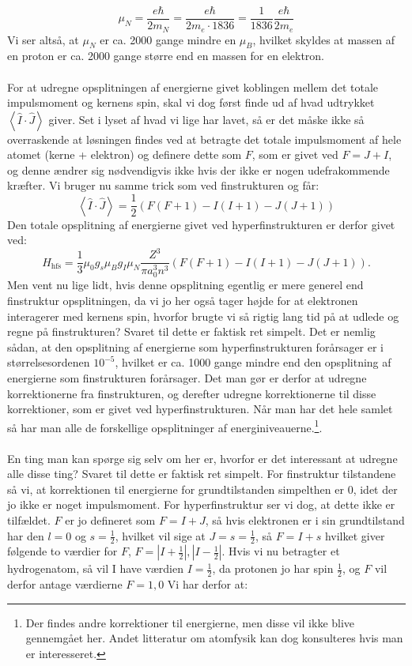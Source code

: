 \documentclass[../../Atom-ogMolekylefysik.tex]{subfiles}
\begin{document}
\begin{equation}
    \mu_N=\frac{e\hbar}{2m_N}=\frac{e\hbar}{2m_e\cdot1836}=\frac{1}{1836}\frac{e\hbar}{2m_e}
\end{equation}
Vi ser altså, at $\mu_N$ er ca. 2000 gange mindre en $\mu_B$, hvilket skyldes at massen af en proton er ca. 2000 gange større end en massen for en elektron.\\
\\
For at udregne opsplitningen af energierne givet koblingen mellem det totale impulsmoment og kernens spin, skal vi dog først finde ud af hvad udtrykket $\left<\hat{I}\cdot\hat{J}\right>$ giver. Set i lyset af hvad vi lige har lavet, så er det måske ikke så overraskende at løsningen findes ved at betragte det totale impulsmoment af hele atomet (kerne + elektron) og definere dette som $F$, som er givet ved $F=J+I$, og denne ændrer sig nødvendigvis ikke hvis der ikke er nogen udefrakommende kræfter. Vi bruger nu samme trick som ved finstrukturen og får:
\begin{equation}
    \left<\hat{I}\cdot\hat{J}\right>=\frac{1}{2}(F(F+1)-I(I+1)-J(J+1))
\end{equation}
Den totale opsplitning af energierne givet ved hyperfinstrukturen er derfor givet ved:
\begin{equation}
    H_\text{hfs}=\frac{1}{3}\mu_0g_s\mu_Bg_I\mu_N\frac{Z^3}{\pi a_0^3n^3}(F(F+1)-I(I+1)-J(J+1)).
\end{equation}
Men vent nu lige lidt, hvis denne opsplitning egentlig er mere generel end finstruktur opsplitningen, da vi jo her også tager højde for at elektronen interagerer med kernens spin, hvorfor brugte vi så rigtig lang tid på at udlede og regne på finstrukturen? Svaret til dette er faktisk ret simpelt. Det er nemlig sådan, at den opsplitning af energierne som hyperfinstrukturen forårsager er i størrelsesordenen $10^{-5}$, hvilket er ca. 1000 gange mindre end den opsplitning af energierne som finstrukturen forårsager. Det man gør er derfor at udregne korrektionerne fra finstrukturen, og derefter udregne korrektionerne til disse korrektioner, som er givet ved hyperfinstrukturen. Når man har det hele samlet så har man alle de forskellige opsplitninger af energiniveauerne.\footnote{Der findes andre korrektioner til energierne, men disse vil ikke blive gennemgået her. Andet litteratur om atomfysik kan dog konsulteres hvis man er interesseret.}.\\
\\
En ting man kan spørge sig selv om her er, hvorfor er det interessant at udregne alle disse ting? Svaret til dette er faktisk ret simpelt. For finstruktur tilstandene så vi, at korrektionen til energierne for grundtilstanden simpelthen er 0, idet der jo ikke er noget impulsmoment. For hyperfinstruktur ser vi dog, at dette ikke er tilfældet. $F$ er jo defineret som $F=I+J$, så hvis elektronen er i sin grundtilstand har den $l=0$ og $s=\frac{1}{2}$, hvilket vil sige at $J=s=\frac{1}{2}$, så $F=I+s$ hvilket giver følgende to værdier for $F$, $F=|I+\frac{1}{2}|,|I-\frac{1}{2}|$. Hvis vi nu betragter et hydrogenatom, så vil I have værdien $I=\frac{1}{2}$, da protonen jo har spin $\frac{1}{2}$, og $F$ vil derfor antage værdierne $F=1,0$ Vi har derfor at:
\end{document}
